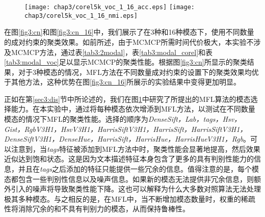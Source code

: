 \begin{figure}[t]
    \centering
    \texttt{[image: chap3/corel5k\_voc\_1\_16\_acc.eps]}
    \texttt{[image: chap3/corel5k\_voc\_1\_16\_nmi.eps]}
	\label{fig3:1_16}
\end{figure} 

在图\ref{fig3:cn}和图\ref{fig3:cn_16}中，我们展示了在3种和16种模态下，使用不同数量的成对约束的聚类效果。如前所述，由于MCMCP所需时间代价极大，本实验不涉及MCMCP方法，通过表\ref{tab3:2modal}，表\ref{tab3:modal_corel}和表\ref{tab3:modal_voc}足以显示MCMCP的聚类性能。根据图\ref{fig3:cn}所显示的聚类结果，对于3种模态的情况，MFL方法在不同数量成对约束的设置下的聚类效果均优于其他方法，这种优势在图\ref{fig3:cn_16}所展示的实验结果中变得更加明显。


正如在第\ref{sec3:dis}节中所论述的，我们在图\ref{fig3:1_16}中研究了所提出的MFL算法的模态选择能力。在本实验中，通过将每种模态依次增添到MFL方法，以测试在不同数量模态的情况下MFL的聚类性能。选择的顺序为\textit{DenseSift，Lab，tags，Hsv，Gist，RgbV3H1，HsvV3H1，HarrisSiftV3H1，HarrisSift，HarrisSiftV3H1，DenseSiftV3H1，DenseHue，HarrisSift，HarrisHue，HarrisHueV3H1，Rgb}。可以注意到，当\textit{tags}特征被添加到MFL方法中时，聚类性能会显著地提高，然后效果近似达到饱和状态。这是因为文本描述特征本身包含了更多的具有判别性能力的信息，并且在\textit{tags}之后添加的特征只能提供一些冗余的信息。值得注意的是，每个模态都包含一些判别性信息以及噪声信息。如果新的模态无法提供非冗余信息，则额外引入的噪声将导致聚类性能下降。这也可以解释为什么大多数对照算法无法处理极其多种模态。与之相反的是，在MFL中，当不断增加模态数量时，权重的稀疏性将消除冗余的和不具有判别力的模态，从而保持鲁棒性。

